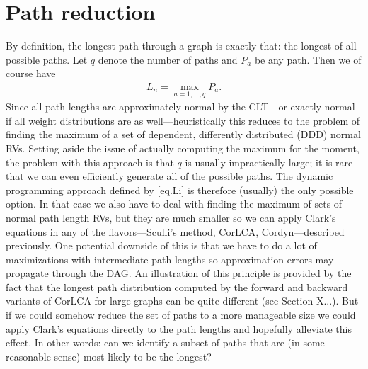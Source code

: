 \documentclass[12pt]{article}
\begin{document}

\section{Path reduction}
\label{sect.path_reduction}

By definition, the longest path through a graph is exactly that: the longest of all possible paths. Let $q$ denote the number of paths and $P_a$ be any path. Then we of course have
\begin{align}
  \label{eq.lp_definition}
  L_n = \max_{a = 1, \dots, q} P_a.
\end{align}
Since all path lengths are approximately normal by the CLT---or exactly normal if all weight distributions are as well---heuristically this reduces to the problem of finding the maximum of a set of dependent, differently distributed (DDD) normal RVs. Setting aside the issue of actually computing the maximum for the moment, the problem with this approach is that $q$ is usually impractically large; it is rare that we can even efficiently generate all of the possible paths. The dynamic programming approach defined by \eqref{eq.Li} is therefore (usually) the only possible option. In that case we also have to deal with finding the maximum of sets of normal path length RVs, but they are much smaller so we can apply Clark's equations in any of the flavors---Sculli's method, CorLCA, Cordyn---described previously. One potential downside of this is that we have to do a lot of maximizations with intermediate path lengths so approximation errors may propagate through the DAG. An illustration of this principle is provided by the fact that the longest path distribution computed by the forward and backward variants of CorLCA for large graphs can be quite different (see Section X...). But if we could somehow reduce the set of paths to a more manageable size we could apply Clark's equations directly to the path lengths and hopefully alleviate this effect. In other words: can we identify a subset of paths that are (in some reasonable sense) most likely to be the longest?
\end{document}
